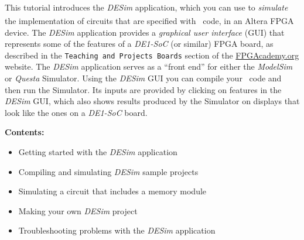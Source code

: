This tutorial introduces the {\it DESim}\textsuperscript{\textregistered} application, 
which you can use to {\it simulate} the implementation of circuits that are specified 
with \hdlName~code\ifnotSV{}\fi, 
in an Altera\textsuperscript{\textregistered} FPGA device. 
The {\it DESim} application provides a {\it graphical user interface} 
(GUI) that represents some of the features of a {\it DE1-SoC} (or similar) FPGA board, 
as described in the \texttt{Teaching and Projects Boards} section of the 
{\small \href{https://www.fpgacademy.org/boards.html} {FPGAcademy.org}} website.
The {\it DESim} application serves as a ``front end'' for 
either the {\it ModelSim} or {\it Questa}
Simulator. Using the {\it DESim} GUI you can compile your
\hdlName~code and then run the Simulator. Its inputs are provided by 
clicking on features in the {\it DESim} GUI, which also shows results produced by 
the Simulator on displays that look like the ones on a {\it DE1-SoC} board.

{\bf Contents:}
\vspace{-1em}
\begin{itemize}
\item Getting started with the {\it DESim} application
\item Compiling and simulating {\it DESim} sample projects
\item Simulating a circuit that includes a memory module
\item Making your own {\it DESim} project
\item Troubleshooting problems with the {\it DESim} application
\end{itemize}

